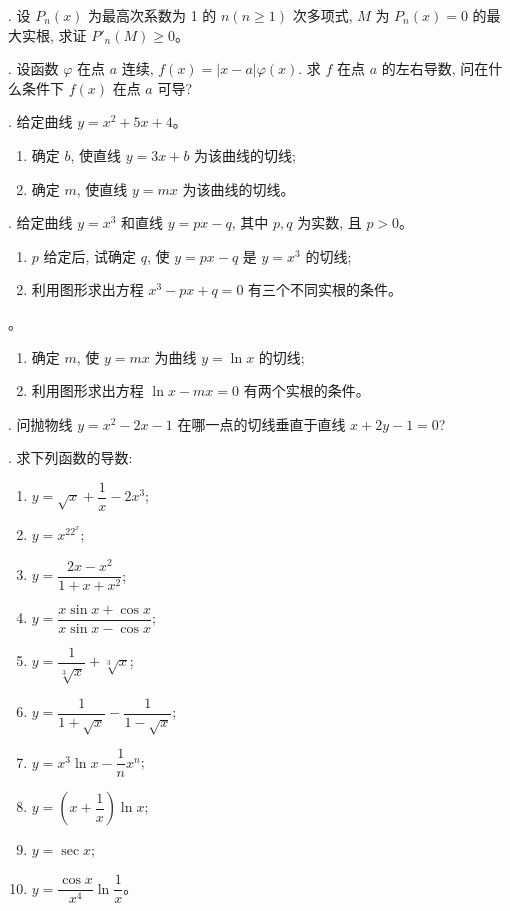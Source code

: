 \documentclass[UTF8, 12pt, fontset=fandol, oneside]{ctexart}
\begin{document}
. 设 $P_n(x)$ 为最高次系数为 1 的 $n(n\geqslant1)$ 次多项式, $M$ 为 $P_n(x)=0$ 的最大实根, 求证 $P'_n(M)\geqslant0$。

. 设函数 $\varphi$ 在点 $a$ 连续, $f(x)=|x-a|\varphi(x)$. 求 $f$ 在点 $a$ 的左右导数, 问在什么条件下 $f(x)$ 在点 $a$ 可导?

. 给定曲线 $y=x^2+5x+4$。
\begin{enumerate}
  \item 确定 $b$, 使直线 $y=3x+b$ 为该曲线的切线;
  \item 确定 $m$, 使直线 $y=mx$ 为该曲线的切线。
\end{enumerate}

. 给定曲线 $y=x^3$ 和直线 $y=px-q$, 其中 $p,q$ 为实数, 且 $p>0$。
\begin{enumerate}
  \item $p$ 给定后, 试确定 $q$, 使 $y=px-q$ 是 $y=x^3$ 的切线;
  \item 利用图形求出方程 $x^3-px+q=0$ 有三个不同实根的条件。
\end{enumerate}

。
\begin{enumerate}
  \item 确定 $m$, 使 $y=mx$ 为曲线 $y=\ln x$ 的切线;
  \item 利用图形求出方程 $\ln x-mx=0$ 有两个实根的条件。
\end{enumerate}

. 问抛物线 $y=x^2-2x-1$ 在哪一点的切线垂直于直线 $x+2y-1=0$?

. 求下列函数的导数:
\begin{enumerate}
  \item $y=\sqrt{x}+\dfrac1x-2x^3$;
  \item $y=x^22^x$;
  \item $y=\dfrac{2x-x^2}{1+x+x^2}$;
  \item $y=\dfrac{x\sin x+\cos x}{x\sin x-\cos x}$;
  \item $y=\dfrac1{\sqrt[3]{x}}+\sqrt[3]{x}$;
  \item $y=\dfrac1{1+\sqrt{x}}-\dfrac1{1-\sqrt{x}}$;
  \item $y=x^3\ln x-\dfrac1n x^n$;
  \item $y=\left(x+\dfrac1x\right)\ln x$;
  \item $y=\sec x$;
  \item $y=\dfrac{\cos x}{x^4}\ln\dfrac1x$。
\end{enumerate}
\end{document}

